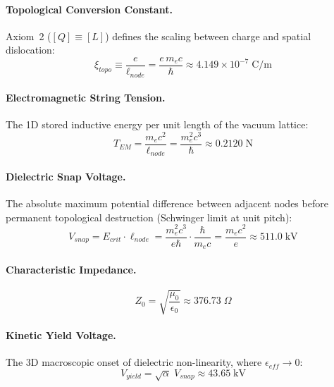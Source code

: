 \paragraph{Topological Conversion Constant.}
Axiom~2 ($[Q] \equiv [L]$) defines the scaling between charge and spatial
dislocation:
\begin{equation}
    \xi_{topo} \equiv \frac{e}{\ell_{node}}
    = \frac{e \, m_e c}{\hbar}
    \approx 4.149 \times 10^{-7}\;\text{C/m}
    \label{eq:xi_topo}
\end{equation}

\paragraph{Electromagnetic String Tension.}
The 1D stored inductive energy per unit length of the vacuum lattice:
\begin{equation}
    T_{EM} = \frac{m_e c^2}{\ell_{node}}
    = \frac{m_e^2 c^3}{\hbar}
    \approx 0.2120\;\text{N}
    \label{eq:T_EM}
\end{equation}

\paragraph{Dielectric Snap Voltage.}
The absolute maximum potential difference between adjacent nodes before
permanent topological destruction (Schwinger limit at unit pitch):
\begin{equation}
    V_{snap} = E_{crit} \cdot \ell_{node}
    = \frac{m_e^2 c^3}{e\hbar} \cdot \frac{\hbar}{m_e c}
    = \frac{m_e c^2}{e}
    \approx 511.0\;\text{kV}
    \label{eq:Vsnap}
\end{equation}

\paragraph{Characteristic Impedance.}
\begin{equation}
    Z_0 = \sqrt{\frac{\mu_0}{\epsilon_0}}
    \approx 376.73\;\Omega
    \label{eq:Z0}
\end{equation}

\paragraph{Kinetic Yield Voltage.}
The 3D macroscopic onset of dielectric non-linearity, where
$\epsilon_{eff} \to 0$:
\begin{equation}
    V_{yield} = \sqrt{\alpha}\;V_{snap}
    \approx 43.65\;\text{kV}
    \label{eq:Vyield}
\end{equation}

